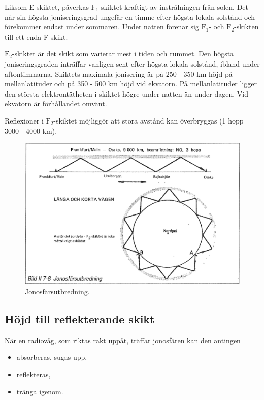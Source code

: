 Liksom E-skiktet, påverkas \(\mathrm{F_1}\)-skiktet kraftigt av
instrålningen från solen. Det når sin högsta joniseringsgrad ungefär
en timme efter högsta lokala solstånd och förekommer endast under
sommaren. Under natten förenar sig \(\mathrm{F_1}\)- och
\(\mathrm{F_2}\)-skikten till ett enda F-skikt.

\(\mathrm{F_2}\)-skiktet är det skikt som varierar mest i tiden och
rummet. Den högsta joniseringsgraden inträffar vanligen sent efter
högsta lokala solstånd, ibland under aftontimmarna.  Skiktets maximala
jonisering är på 250 - 350 km höjd på mellanlatituder och på 350 - 500
km höjd vid ekvatorn. På mellanlatituder ligger den största
elektrontätheten i skiktet högre under natten än under dagen. Vid
ekvatorn är förhållandet omvänt.

Reflexioner i \(\mathrm{F_2}\)-skiktet möjliggör att stora
avstånd kan överbryggas (1 hopp = 3000 - 4000 km).

\begin{figure}
  \includegraphics[width=\textwidth]{images/bild_2_7-08}
  \caption{Jonosfärsutbredning.}
  \label{fig:bildII7-8}
\end{figure}

\subsection{Höjd till reflekterande skikt}

När en radiovåg, som riktas rakt uppåt, träffar jonosfären kan den antingen
\begin{itemize}
\item absorberas, sugas upp,
\item reflekteras,
\item tränga igenom.
\end{itemize}

